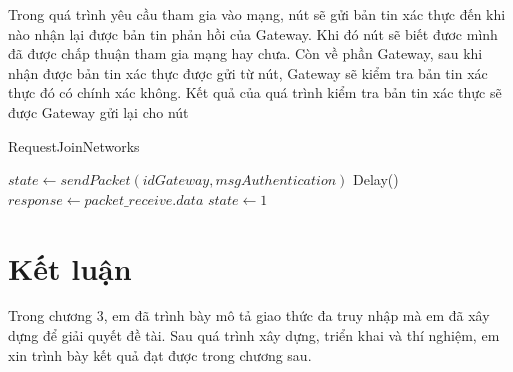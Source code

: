 \par 
Trong quá trình yêu cầu tham gia vào mạng, nút sẽ gửi bản tin xác thực đến khi nào nhận lại được bản tin phản hồi của Gateway. Khi đó nút sẽ biết đươc mình đã được chấp thuận tham gia mạng hay chưa. Còn về phần Gateway, sau khi nhận được bản tin xác thực được gửi từ nút, Gateway sẽ kiểm tra bản tin xác thực đó có chính xác không. Kết quả của quá trình kiểm tra bản tin xác thực sẽ được Gateway gửi lại cho nút
\begin{algorithm}
\caption{RequestJoinNetworks}
\label{RequestJoinNetworks}
\begin{algorithmic}[1]
	\Repeat
			\State $state \gets sendPacket(idGateway, msgAuthentication)$ 
				\State Delay()
				\State $response \gets packet\_receive.data$
					\State $state \gets 1$
				\EndIf
			\EndIf
  \EndProcedure
\end{algorithmic}
\end{algorithm}
\section{Kết luận}
Trong chương 3, em đã trình bày mô tả giao thức đa truy nhập mà em đã xây dựng để giải quyết đề tài. Sau quá trình xây dựng, triển khai và thí nghiệm, em xin trình bày kết quả đạt được trong chương sau.



